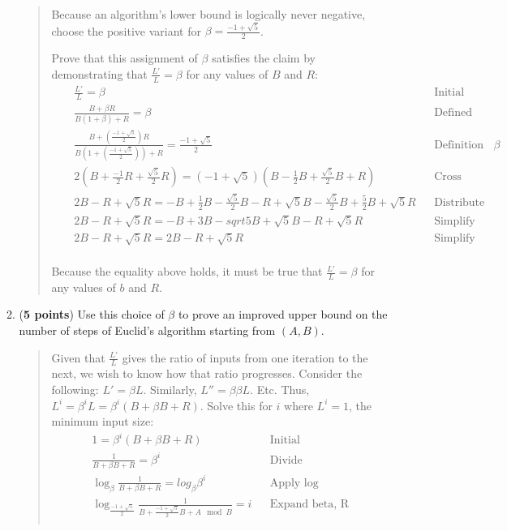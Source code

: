 \documentclass[11pt]{article}
\begin{document}
\begin{enumerate}[leftmargin=*]
\begin{enumerate}
\begin{quote}
      Because an algorithm's lower bound is logically never negative, choose the positive variant for $\beta = \frac{-1 + \sqrt 5}{2}$.

      \medskip
      Prove that this assignment of $\beta$ satisfies the claim by demonstrating that $\frac{L'}{L} = \beta$ for any values of $B$ and $R$: 
      \begin{align*}
          && \frac{L'}{L} = \beta && \text{Initial} && \\
          && \frac{B + \beta R}{B(1 + \beta) + R} = \beta && \text{Defined above} && \\
          && \frac{B + (\frac{-1 + \sqrt 5}{2}) R}{B(1 + (\frac{-1 + \sqrt 5}{2})) + R} = \frac{-1 + \sqrt 5}{2} && \text{Definition of $\beta$} && \\
          && 2(B + \frac{-1}{2}R + \frac{\sqrt 5}{2}R) = (-1 + \sqrt 5)(B - \frac{1}{2}B + \frac{\sqrt 5}{2}B + R) && \text{Cross multiply} && \\
          && 2B - R + \sqrt{5}R = -B + \frac{1}{2}B - \frac{\sqrt 5}{2}B - R + \sqrt{5}B - \frac{\sqrt 5}{2}B + \frac{5}{2}B + \sqrt{5}R && \text{Distribute} && \\
          && 2B - R + \sqrt{5}R = -B + 3B - sqrt{5}B + \sqrt{5}B - R + \sqrt{5}R && \text{Simplify} && \\
          && 2B - R + \sqrt{5}R = 2B - R + \sqrt{5}R && \text{Simplify} && \\
      \end{align*} 

      Because the equality above holds, it must be true that $\frac{L'}{L} = \beta$ for any values of $b$ and $R$. 
      \end{quote}
    \item (\textbf{5 points}) Use this choice of $\beta$ to prove an improved upper bound on the number of steps of Euclid's algorithm starting from $(A,B)$.
      \begin{quote}
        \color{purple}
        Given that $\frac{L'}{L}$ gives the ratio of inputs from one iteration to the next, we wish to know how that ratio progresses. Consider the following: $L' = \beta L$. Similarly, $L'' = \beta \beta L$. Etc. Thus, $L^i = \beta^i L = \beta^i(B + \beta B + R)$. Solve this for $i$ where $L^i = 1$, the minimum input size:
      \begin{align*}
          && 1 = \beta^i(B + \beta B + R) && \text{Initial} && \\
          && \frac{1}{B + \beta B + R} = \beta^i && \text{Divide} && \\
          && \log_{\beta}\frac{1}{B + \beta B + R} = log_{\beta} \beta^i && \text{Apply log} && \\
          && \log_{\frac{-1 + \sqrt{5}}{2}}\frac{1}{B + \frac{-1 + \sqrt{5}}{2} B + A \mod B} = i && \text{Expand beta, R} && \\
      \end{align*} 


\end{quote}
\end{enumerate}
\end{enumerate}
\end{document}
